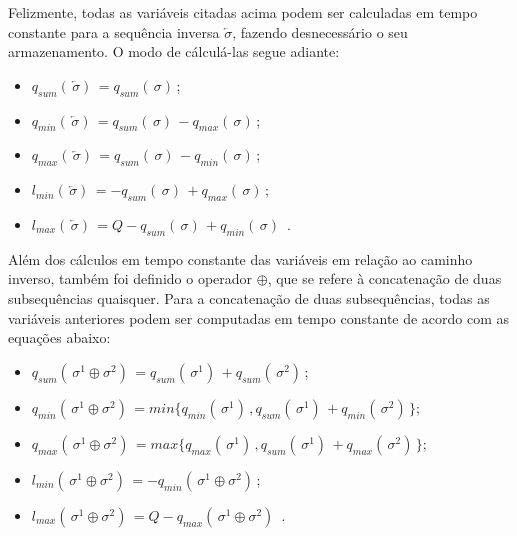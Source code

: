 \par Felizmente, todas as variáveis citadas acima podem ser calculadas em tempo constante para a sequência inversa $\overleftarrow{\sigma}$, fazendo desnecessário o seu armazenamento. O modo de cálculá-las segue adiante:

    \begin{itemize}
        \item $q_{sum}(\,\overleftarrow{\sigma})\, = q_{sum}(\,\sigma)\,$;
        \item $q_{min}(\,\overleftarrow{\sigma})\, = q_{sum}(\,\sigma)\, - q_{max}(\,\sigma)\,$;
        \item $q_{max}(\,\overleftarrow{\sigma})\, = q_{sum}(\,\sigma)\, - q_{min}(\,\sigma)\,$;
        \item $l_{min}(\,\overleftarrow{\sigma})\, = -q_{sum}(\,\sigma)\, + q_{max}(\,\sigma)\,$;
        \item $l_{max}(\,\overleftarrow{\sigma})\, = Q -q_{sum}(\,\sigma)\, + q_{min}(\,\sigma)\,$ .
    \end{itemize}
    
\par Além dos cálculos em tempo constante das variáveis em relação ao caminho inverso, também foi definido o operador $\oplus$, que se refere à concatenação de duas subsequências quaisquer. Para a concatenação de duas subsequências, todas as variáveis anteriores podem ser computadas em tempo constante de acordo com as equações abaixo:

    \begin{itemize}
        \item $q_{sum}(\,\sigma^1 \oplus \sigma^2)\, = q_{sum}(\,\sigma^1)\, + q_{sum}(\,\sigma^2)\,$;
        \item $q_{min}(\,\sigma^1 \oplus \sigma^2)\, = min\{q_{min}(\,\sigma^1)\,, q_{sum}(\,\sigma^1)\, + q_{min}(\,\sigma^2)\,\}$;
        \item $q_{max}(\,\sigma^1 \oplus \sigma^2)\, = max\{q_{max}(\,\sigma^1)\,, q_{sum}(\,\sigma^1)\, + q_{max}(\,\sigma^2)\,\}$;
        \item $l_{min}(\,\sigma^1 \oplus \sigma^2)\, = -q_{min}(\,\sigma^1 \oplus \sigma^2)\,$;
        \item $l_{max}(\,\sigma^1 \oplus \sigma^2)\, = Q - q_{max}(\,\sigma^1 \oplus \sigma^2)\,$ .
    \end{itemize}
    
